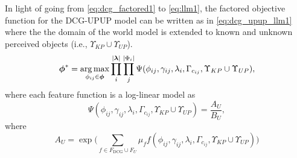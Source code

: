 In light of going from \eqref{eq:dcg_factored1} to \eqref{eq:llm1}, the factored objective function for the DCG-UPUP model can be written as in \eqref{eq:dcg_upup_llm1} where the the domain of the world model is extended to known and unknown perceived objects (i.e., $\Upsilon_{KP} \cup \Upsilon_{UP}$).
\begin{equation}
\boldsymbol{\phi}^* = \operatorname*{\arg\max}_{\phi_{ij} \in \boldsymbol{\phi}} \prod_{i}^{|\boldsymbol\lambda|} \prod_{j}^{|\Phi_i|} \Psi(\phi_{ij},\gamma_{ij},\lambda_i,\Gamma_{c_{ij}},\Upsilon_{KP} \cup \Upsilon_{UP}),
\label{eq:dcg_upup_llm1}
\end{equation}
where each feature function is a log-linear model as
\begin{equation}
\Psi(\phi_{ij},\gamma_{ij},\lambda_i,\Gamma_{c_{ij}},\Upsilon_{KP} \cup \Upsilon_{UP}) = \frac{A_U}{B_U},
\label{eq:dcg_upup_llm2}
\end{equation}
where
\begin{equation}
A_U= \exp \Big( \sum_{f \in F_{\text{DCG}} \cup F_U} \mu_f f(\phi_{ij},\gamma_{ij},\lambda_i,\Gamma_{c_{ij}},\Upsilon_{KP} \cup \Upsilon_{UP}) \Big) \nonumber
\end{equation}

